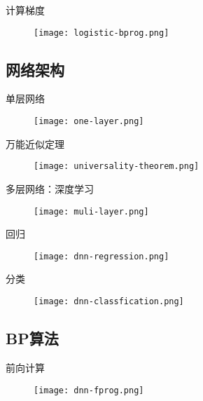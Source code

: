 \begin{frame}[fragile]{计算梯度}
  \begin{figure}
    \centering
    \texttt{[image: logistic-bprog.png]}
  \end{figure}
\end{frame}

\subsection{网络架构}

\begin{frame}[fragile]{单层网络}
  \begin{figure}
    \centering
    \texttt{[image: one-layer.png]}
  \end{figure}
\end{frame}

\begin{frame}[fragile]{万能近似定理}
  \begin{figure}
    \centering
    \texttt{[image: universality-theorem.png]}
  \end{figure}
\end{frame}

\begin{frame}[fragile]{多层网络：深度学习}
  \begin{figure}
    \centering
    \texttt{[image: muli-layer.png]}
  \end{figure}
\end{frame}

\begin{frame}[fragile]{回归}
  \begin{figure}
    \centering
    \texttt{[image: dnn-regression.png]}
  \end{figure}
\end{frame}

\begin{frame}[fragile]{分类}
  \begin{figure}
    \centering
    \texttt{[image: dnn-classfication.png]}
  \end{figure}
\end{frame}

\subsection{BP算法}

\begin{frame}[fragile]{前向计算}
  \begin{figure}
    \centering
    \texttt{[image: dnn-fprog.png]}
  \end{figure}
\end{frame}

